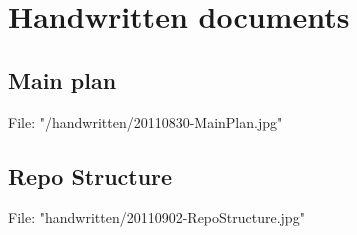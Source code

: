 \section{Handwritten documents}

\subsection{Main plan}
\label{handwritten:MainPlan}
File: "/handwritten/20110830-MainPlan.jpg"

\subsection{Repo Structure}
\label{handwritten:RepoStructure}
File: "handwritten/20110902-RepoStructure.jpg"
